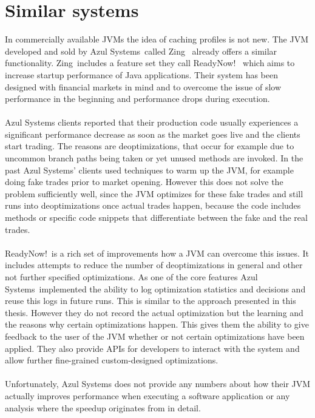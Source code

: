 \section{Similar systems}
\label{s:similarsystems}
In commercially available JVMs the idea of caching profiles is not new.
The JVM developed and sold by Azul Systems\textregistered\ called Zing\textregistered\ \cite{zing} already offers a similar functionality.
Zing\textregistered\ includes a feature set they call ReadyNow!\texttrademark\ \cite{readynow} which aims to increase startup performance of Java applications.
Their system has been designed with financial markets in mind and to overcome the issue of slow performance in the beginning and performance drops during execution.
\\\\
Azul Systems clients reported that their production code usually experiences a significant performance decrease as soon as the market goes live and the clients start trading.
The reasons are deoptimizations, that occur for example due to uncommon branch paths being taken or yet unused methods are invoked.
In the past Azul Systems' clients used techniques to warm up the JVM, for example doing fake trades prior to market opening. However this does not solve the problem sufficiently well, since the JVM optimizes for these fake trades and still runs into deoptimizations once actual trades happen, because the code includes methods or specific code snippets that differentiate between the fake and the real trades.
\\\\
ReadyNow!\texttrademark\ is a rich set of improvements how a JVM can overcome this issues. It includes attempts to reduce the number of deoptimizations in general and other not further specified optimizations.
As one of the core features Azul Systems\textregistered\ implemented the ability to log optimization statistics and decisions and reuse this logs in future runs. This is similar to the approach presented in this thesis. However they do not record the actual optimization but the learning and the reasons why certain optimizations happen. This gives them the ability to give feedback to the user of the JVM whether or not certain optimizations have been applied. They also provide APIs for developers to interact with the system and allow further fine-grained custom-designed optimizations.
\\\\
Unfortunately, Azul Systems does not provide any numbers about how their JVM actually improves performance when executing a software application or any analysis where the speedup originates from in detail.
